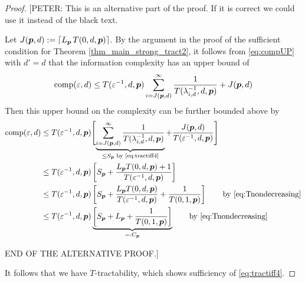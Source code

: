 \documentclass[11pt,a4paper]{article}
\newcommand{\peter}[1]{\begingroup\color{purple}#1\endgroup}
\begin{document}
\begin{proof}
\peter{
[PETER: This is an alternative part of the proof. If it is correct we could use it instead of the black text. 

\bigskip

Let $J(\boldsymbol{p},d): = \lceil L_{\boldsymbol{p}}\, T(0,d,\boldsymbol{p})\rceil$. By the argument in the proof of the sufficient condition for Theorem \ref{thm_main_strong_tract2}, it follows from \eqref{eq:compUP} with $d'=d$ that the information complexity has an upper bound of
\begin{equation*}
	 \operatorname{comp}(\varepsilon,d) \le  T(\varepsilon^{-1},d,\boldsymbol{p}) \sum_{i=J(\boldsymbol{p},d)}^\infty \frac{1}{T(\lambda_{i, d}^{-1},d,\boldsymbol{p})} + J(\boldsymbol{p},d)
\end{equation*}
 Then this upper bound on the complexity can be further bounded above by
\begin{align*}
       \operatorname{comp}(\varepsilon,d)
       & \le T(\varepsilon^{-1},d,\boldsymbol{p}) \Biggl [ 
       \underbrace{\sum_{i=J(\boldsymbol{p},d)}^\infty \frac{1}{T(\lambda_{i, d}^{-1},d,\boldsymbol{p})}}_{\le S_{\boldsymbol{p}} \text{ by \eqref{eq:tractiff4}}}
       + \frac{J(\boldsymbol{p},d)}{T(\varepsilon^{-1},d, \boldsymbol{p})} \Biggr ] \\
       & \le T(\varepsilon^{-1},d,\boldsymbol{p})\left[ S_{\boldsymbol{p}} + \frac{L_{\boldsymbol{p}} T(0,d,\boldsymbol{p})+1}{T(\varepsilon^{-1},d, \boldsymbol{p})}\right]\\
       & \le T(\varepsilon^{-1},d,\boldsymbol{p})\left[S_{\boldsymbol{p}} +\frac{L_{\boldsymbol{p}} T(0,d,\boldsymbol{p})}{T(\varepsilon^{-1},d, \boldsymbol{p})}
       + \frac{1}{T(0,1, \boldsymbol{p})}\right]
       \qquad \text{by \eqref{eq:Tnondecreasing}}   \\
       & \le T(\varepsilon^{-1},d,\boldsymbol{p}) 
       \underbrace{\left [  S_{\boldsymbol{p}} + L_{\boldsymbol{p}} + \frac{1}{T(0,1, \boldsymbol{p})}\right]}_{=:C_{\boldsymbol{p}}}
       \qquad \text{by \eqref{eq:Tnondecreasing}}  
\end{align*}


\bigskip

END OF THE ALTERNATIVE PROOF.]
}


It follows that we have $T$-tractability, which shows sufficiency of \eqref{eq:tractiff4}.

\bigskip


\end{proof}
\end{document}
